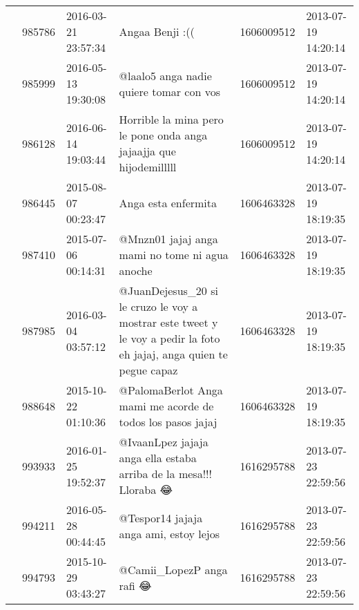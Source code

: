 \begin{tabular}{llllrl}
           & 985786  & 2016-03-21 23:57:34 &                                                                                                                              Angaa Benji :(( &  1606009512 & 2013-07-19 14:20:14 \\
           & 985999  & 2016-05-13 19:30:08 &                                                                                                      @laalo5 anga nadie quiere tomar con vos &  1606009512 & 2013-07-19 14:20:14 \\
           & 986128  & 2016-06-14 19:03:44 &                                                                           Horrible la mina pero le pone onda anga jajaajja que hijodemilllll &  1606009512 & 2013-07-19 14:20:14 \\
           & 986445  & 2015-08-07 00:23:47 &                                                                                                                          Anga esta enfermita &  1606463328 & 2013-07-19 18:19:35 \\
           & 987410  & 2015-07-06 00:14:31 &                                                                                               @Mnzn01 jajaj anga mami no tome ni agua anoche &  1606463328 & 2013-07-19 18:19:35 \\
           & 987985  & 2016-03-04 03:57:12 &                         @JuanDejesus\_20 si le cruzo le voy a mostrar este tweet y le voy a pedir la foto eh jajaj, anga quien te pegue capaz &  1606463328 & 2013-07-19 18:19:35 \\
           & 988648  & 2015-10-22 01:10:36 &                                                                                   @PalomaBerlot Anga mami me acorde de todos los pasos jajaj &  1606463328 & 2013-07-19 18:19:35 \\
           & 993933  & 2016-01-25 19:52:37 &                                                                            @IvaanLpez jajaja anga ella estaba arriba de la mesa!!! Lloraba 😂 &  1616295788 & 2013-07-23 22:59:56 \\
           & 994211  & 2016-05-28 00:44:45 &                                                                                                       @Tespor14 jajaja anga ami, estoy lejos &  1616295788 & 2013-07-23 22:59:56 \\
           & 994793  & 2015-10-29 03:43:27 &                                                                                                                    @Camii\_LopezP anga rafi 😂 &  1616295788 & 2013-07-23 22:59:56 \\

\end{tabular}
